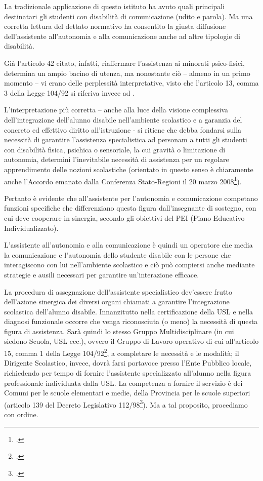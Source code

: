La tradizionale applicazione di questo istituto ha avuto quali principali destinatari gli studenti con disabilità di comunicazione (udito e parola). Ma una corretta lettura del dettato normativo ha consentito la giusta diffusione dell'assistente all'autonomia e alla comunicazione anche ad altre tipologie di disabilità.

Già l'articolo 42 citato, infatti, riaffermare l'assistenza ai minorati psico-fisici, determina un ampio bacino di utenza, ma nonostante ciò – almeno in un primo momento – vi erano delle perplessità interpretative, visto che l'articolo 13, comma 3 della Legge 104/92 si riferiva invece ad .

L'interpretazione più corretta – anche alla luce della visione complessiva dell'integrazione dell'alunno disabile nell'ambiente scolastico e a garanzia del concreto ed effettivo diritto all'istruzione - si ritiene che debba fondarsi sulla necessità di garantire l'assistenza specialistica ad personam a tutti gli studenti con disabilità fisica, psichica o sensoriale, la cui gravità o limitazione di autonomia, determini l'inevitabile necessità di assistenza per un regolare apprendimento delle nozioni scolastiche (orientato in questo senso è chiaramente anche l'Accordo emanato dalla Conferenza Stato-Regioni il 20 marzo 2008\footcite{ra_39_2008}).

Pertanto è evidente che all'assistente per l'autonomia e comunicazione competano funzioni specifiche che differenziano questa figura dall'insegnante di sostegno, con cui deve cooperare in sinergia, secondo gli obiettivi del PEI (Piano Educativo Individualizzato).

L'assistente all'autonomia e alla comunicazione è quindi un operatore che media la comunicazione e l'autonomia dello studente disabile con le persone che interagiscono con lui nell'ambiente scolastico e ciò può compiersi anche mediante strategie e ausili necessari per garantire un'interazione efficace.

La procedura di assegnazione dell'assistente specialistico dev'essere frutto dell'azione sinergica dei diversi organi chiamati a garantire l'integrazione scolastica dell'alunno disabile. Innanzitutto nella certificazione della USL e nella diagnosi funzionale occorre che venga riconosciuta (o meno) la necessità di questa figura di assistenza. Sarà quindi lo stesso Gruppo Multidisciplinare (in cui siedono Scuola, USL ecc.), ovvero il Gruppo di Lavoro operativo di cui all'articolo 15, comma  1 della Legge 104/92\footcite{Legge_104_92}, a completare le necessità e le modalità; il Dirigente Scolastico, invece, dovrà farsi portavoce presso l'Ente Pubblico locale, richiedendo per tempo di fornire l'assistente specializzato all'alunno nella figura professionale individuata dalla USL.
La competenza a fornire il servizio è dei Comuni per le scuole elementari e medie, della Provincia per le scuole superiori (articolo 139 del Decreto Legislativo 112/98\footcite{DL_112_1998}). Ma a tal proposito, procediamo con ordine.

